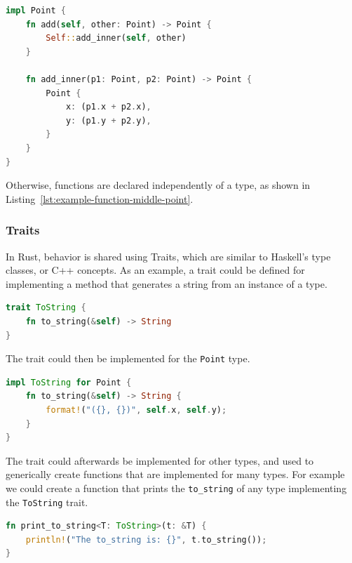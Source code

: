 \documentclass{article}
\begin{document}
\begin{lstlisting}[language=Rust, style=boxed, caption=Associating behavior with the point defined in Listing~\ref{lst:example-struct}, label=lst:example-struct-method]
impl Point {
    fn add(self, other: Point) -> Point {
        Self::add_inner(self, other)
    }

    fn add_inner(p1: Point, p2: Point) -> Point {
        Point {
            x: (p1.x + p2.x),
            y: (p1.y + p2.y),
        }
    }
}
\end{lstlisting}

Otherwise, functions are declared independently of a type, as shown in Listing~\ref{lst:example-function-middle-point}.

\subsubsection{Traits}
In Rust, behavior is shared using Traits, which are similar to Haskell’s type classes, or C++ concepts. As an example, a trait could be defined for implementing a method that generates a string from an instance of a type.

\begin{lstlisting}[language=Rust, style=boxed, caption=Trait definition, label=lst:example-trait]
trait ToString {
    fn to_string(&self) -> String
}
\end{lstlisting}

The trait could then be implemented for the \lstinline{Point} type.

\begin{lstlisting}[language=Rust, style=boxed, caption=Trait implementation, label=lst:example-trait-implementation]
impl ToString for Point {
    fn to_string(&self) -> String {
        format!("({}, {})", self.x, self.y);
    }
}
\end{lstlisting}
The trait could afterwards be implemented for other types, and used to generically create functions that are implemented for many types. For example we could create a function that prints the \lstinline{to_string} of any type implementing the \lstinline{ToString} trait.

\begin{lstlisting}[language=Rust, style=boxed, caption=Trait consumption, label=lst:example-trait-consumption]
fn print_to_string<T: ToString>(t: &T) {
    println!("The to_string is: {}", t.to_string());
}
\end{lstlisting}
\end{document}

